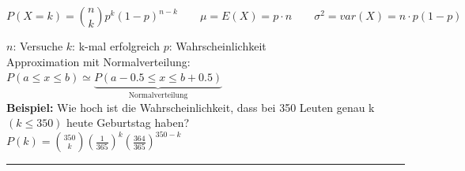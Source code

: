       $$P(X=k) = \binom n k p^k(1-p)^{n-k} \qquad \mu = E(X) = p \cdot n \qquad \sigma^2 =
      var(X) = n \cdot p (1-p)$$

      $n$: Versuche \hspace{10mm}
      $k$: k-mal erfolgreich \hspace{10mm}
      $p$: Wahrscheinlichkeit\\
      
      Approximation mit Normalverteilung: $P(a \leq x \leq b) \simeq \underbrace{P(a-0.5 \leq x \leq b+0.5)}_{\text{Normalverteilung}}$\\
      
      {\bf Beispiel:} Wie hoch ist die Wahrscheinlichkeit, dass bei 350 Leuten genau
      k $(k\leq 350)$ heute Geburtstag haben?\\
      $P(k)=\binom {350} k \left(\frac{1}{365}\right)^k
      \left(\frac{364}{365}\right)^{350-k}$ \\



\hrule
